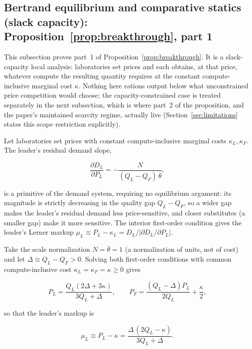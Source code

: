 \documentclass[11pt]{article}
\begin{document}
\subsection{Bertrand equilibrium and comparative statics (slack capacity): Proposition~\ref{prop:breakthrough}, part 1}
\label{subsec:app-bertrand}

This subsection proves part~1 of Proposition~\ref{prop:breakthrough}. It is a slack-capacity local analysis: laboratories set prices and each obtains, at that price, whatever compute the resulting quantity requires at the constant compute-inclusive marginal cost $\kappa$. Nothing here rations output below what unconstrained price competition would choose; the capacity-constrained case is treated separately in the next subsection, which is where part~2 of the proposition, and the paper's maintained scarcity regime, actually live (Section~\ref{sec:limitations} states this scope restriction explicitly).

Let laboratories set prices with constant compute-inclusive marginal costs $\kappa_L,\kappa_F$. The leader's residual demand slope,

\begin{equation}\frac{\partial D_L}{\partial P_L}=-\frac{N}{(Q_L-Q_F)\,\bar\theta},\end{equation}

is a primitive of the demand system, requiring no equilibrium argument: its magnitude is strictly decreasing in the quality gap $Q_L-Q_F$, so a wider gap makes the leader's residual demand less price-sensitive, and closer substitutes (a smaller gap) make it more sensitive. The interior first-order condition gives the leader's Lerner markup $\mu_L\equiv P_L-\kappa_L=D_L\big/\lvert\partial D_L/\partial P_L\rvert$.

Take the scale normalization $N=\bar\theta=1$ (a normalization of units, not of cost) and let $\Delta\equiv Q_L-Q_F>0$. Solving both first-order conditions with common compute-inclusive cost $\kappa_L=\kappa_F=\kappa\geq0$ gives

\begin{equation}P_L=\frac{Q_L(2\Delta+3\kappa)}{3Q_L+\Delta},\qquad P_F=\frac{(Q_L-\Delta)P_L}{2Q_L}+\frac{\kappa}{2},\end{equation}

so that the leader's markup is

\begin{equation}\mu_L\equiv P_L-\kappa=\frac{\Delta\,(2Q_L-\kappa)}{3Q_L+\Delta}.\end{equation}
\end{document}
